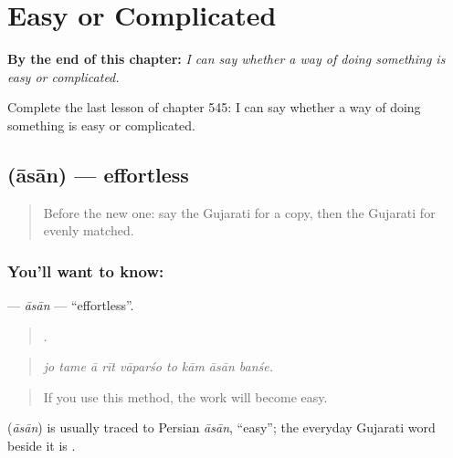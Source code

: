 
\chapter{Easy or Complicated}
\label{ch:gu-easy-or-complicated}

\begin{chapteropening}
\textbf{By the end of this chapter:} \emph{I can say whether a way of doing something is easy or complicated.}

Complete the last lesson of chapter 545: I can say whether a way of doing something is easy or complicated.
\end{chapteropening}

\section[\texorpdfstring{\gu{આસાન} (āsān)}{આસાન (āsān)}]{ (āsān) — effortless}

\label{lesson:GU-C545-asan}



\begin{quote}
Before the new one: say the Gujarati for a copy, then the Gujarati for evenly matched.
\end{quote}

\subsection*{You'll want to know: }
\textbf{} — \emph{āsān} — \textquotedblleft{}effortless\textquotedblright{}.

\begin{quote}
        .
\end{quote}

\begin{quote}
\emph{jo tame ā rīt vāparśo to kām āsān banśe.}
\end{quote}

\begin{quote}
If you use this method, the work will become easy.
\end{quote}

\begin{cousinweb}
\textbf{} (\emph{āsān}) is usually traced to Persian \emph{āsān}, \textquotedblleft{}easy\textquotedblright{}; the everyday Gujarati word beside it is \textbf{}.
\end{cousinweb}

